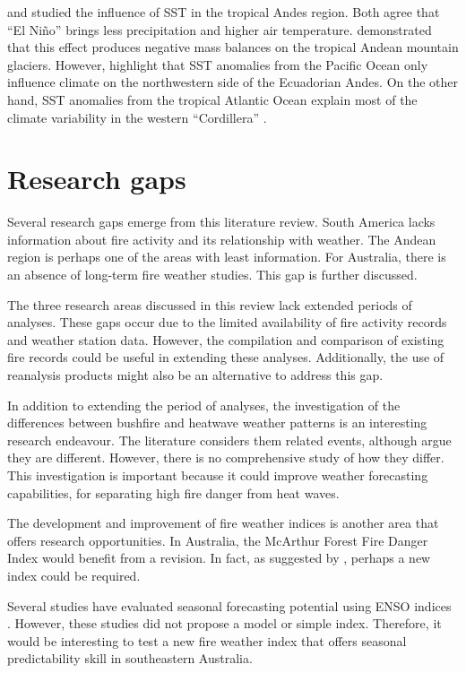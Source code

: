 \citet{Vuille2000} and \citet{Francou2004} studied the influence
of SST in the tropical Andes region. Both agree that \textquotedblleft El
Ni\~no\textquotedblright{} brings less precipitation and higher air
temperature. \citet{Francou2004} demonstrated that this effect produces
negative mass balances on the tropical Andean mountain glaciers. However,
\citet{Vuille2000} highlight that SST anomalies from the Pacific
Ocean only influence climate on the northwestern side of the Ecuadorian
Andes. On the other hand, SST anomalies from the tropical Atlantic
Ocean explain most of the climate variability in the western \textquotedblleft Cordillera\textquotedblright{}
.


\section{Research gaps}

Several research gaps emerge from this literature review. South America lacks information
about fire activity and its relationship with weather. The Andean
region is perhaps one of the areas with least information. For Australia, 
there is an absence of long-term fire weather studies. This gap is further discussed.

The three research areas discussed in this review lack extended periods
of analyses. These gaps occur due to the limited availability of fire activity
records and weather station data. However, the compilation and comparison
of existing fire records could be useful in extending these analyses.
Additionally, the use of reanalysis products might also be an alternative
to address this gap.

In addition to extending the period of analyses, the investigation
of the differences between bushfire and heatwave weather patterns
is an interesting research endeavour. The literature considers them
related events, although \citet{Reeder2015} argue they are different.
However, there is no comprehensive study of how they differ. This
investigation is important because it could improve weather forecasting
capabilities, for separating high fire danger from heat waves.

The development and improvement of fire weather indices is another
area that offers research opportunities. In Australia, the McArthur
Forest Fire Danger Index would benefit from a revision. In fact, as
suggested by \citet{Teague2010}, perhaps a new index could be required. 

Several studies have evaluated seasonal forecasting
potential using ENSO indices \citep{Nicholls2007,Harris2013}. However,
these studies did not propose a model or simple index. Therefore,
it would be interesting to test a new fire weather index that offers
seasonal predictability skill in southeastern Australia. 